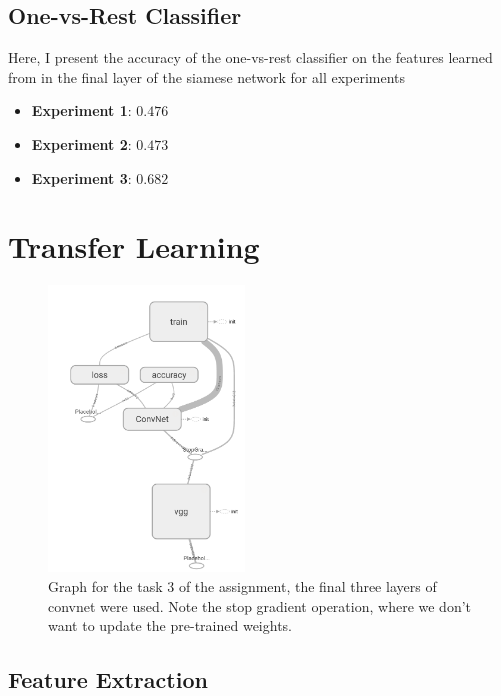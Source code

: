 \documentclass{article}
\begin{document}
\subsection{One-vs-Rest Classifier}
Here, I present the accuracy of the one-vs-rest classifier on the features learned from in the final layer of the siamese network for all experiments
\begin{itemize}
\item \textbf{Experiment 1}: $0.476$
\item \textbf{Experiment 2}: $0.473$
\item \textbf{Experiment 3}: $\mathbf{0.682}$
\end{itemize}

\section{Transfer Learning}
 
 
\begin{figure}[h!]
\centering
\includegraphics[width=5.2cm]{graph.png}
\caption{Graph for the task 3 of the assignment, the final three layers of convnet were used. Note the stop gradient operation, where we don't want to update the pre-trained weights.}
\label{fig:graph}
\end{figure}



\subsection{Feature Extraction}
\end{document}
